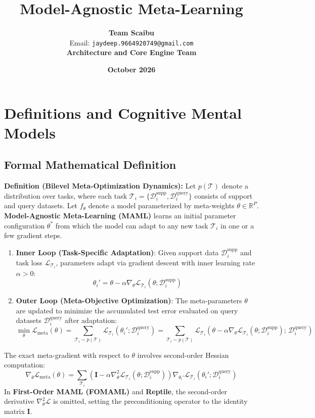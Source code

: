 \documentclass[11pt,a4paper]{article}
\title{\textbf{Model-Agnostic Meta-Learning}}
\author{\textbf{Team Scaibu} \\ \small Email: \texttt{jaydeep.9664920749@gmail.com} \\ \small \textbf{Architecture and Core Engine Team}}
\date{\textbf{October 2026}}
\theoremstyle{definition}
\begin{document}
\maketitle

\section{Definitions and Cognitive Mental Models}

\subsection{Formal Mathematical Definition}
\textbf{Definition (Bilevel Meta-Optimization Dynamics):}
Let $p(\mathcal{T})$ denote a distribution over tasks, where each task $\mathcal{T}_i = \{\mathcal{D}_i^{\text{supp}}, \mathcal{D}_i^{\text{query}}\}$ consists of support and query datasets. Let $f_\theta$ denote a model parameterized by meta-weights $\theta \in \mathbb{R}^P$. \textbf{Model-Agnostic Meta-Learning (MAML)} learns an initial parameter configuration $\theta^*$ from which the model can adapt to any new task $\mathcal{T}_i$ in one or a few gradient steps.
\begin{enumerate}
    \item \textbf{Inner Loop (Task-Specific Adaptation)}: Given support data $\mathcal{D}_i^{\text{supp}}$ and task loss $\mathcal{L}_{\mathcal{T}_i}$, parameters adapt via gradient descent with inner learning rate $\alpha > 0$:
    {\boldmath
    \begin{equation}
    \theta_i' = \theta - \alpha \nabla_\theta \mathcal{L}_{\mathcal{T}_i}(\theta; \mathcal{D}_i^{\text{supp}})
    \end{equation}
    }
    \item \textbf{Outer Loop (Meta-Objective Optimization)}: The meta-parameters $\theta$ are updated to minimize the accumulated test error evaluated on query datasets $\mathcal{D}_i^{\text{query}}$ after adaptation:
    {\boldmath
    \begin{equation}
    \min_\theta \mathcal{L}_{\text{meta}}(\theta) = \sum_{\mathcal{T}_i \sim p(\mathcal{T})} \mathcal{L}_{\mathcal{T}_i}(\theta_i'; \mathcal{D}_i^{\text{query}}) = \sum_{\mathcal{T}_i \sim p(\mathcal{T})} \mathcal{L}_{\mathcal{T}_i}\left( \theta - \alpha \nabla_\theta \mathcal{L}_{\mathcal{T}_i}(\theta; \mathcal{D}_i^{\text{supp}}); \, \mathcal{D}_i^{\text{query}} \right)
    \end{equation}
    }
\end{enumerate}
The exact meta-gradient with respect to $\theta$ involves second-order Hessian computation:
{\boldmath
\begin{equation}
\nabla_\theta \mathcal{L}_{\text{meta}}(\theta) = \sum_{\mathcal{T}_i} \left( \mathbf{I} - \alpha \nabla_\theta^2 \mathcal{L}_{\mathcal{T}_i}(\theta; \mathcal{D}_i^{\text{supp}}) \right) \nabla_{\theta_i'} \mathcal{L}_{\mathcal{T}_i}(\theta_i'; \mathcal{D}_i^{\text{query}})
\end{equation}
}
In \textbf{First-Order MAML (FOMAML)} and \textbf{Reptile}, the second-order derivative $\nabla_\theta^2 \mathcal{L}$ is omitted, setting the preconditioning operator to the identity matrix $\mathbf{I}$.
\end{document}
